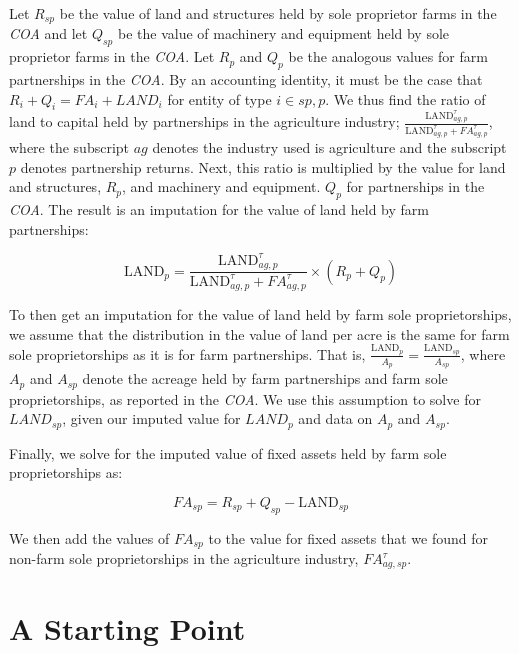 \documentclass[article,11pt,letterpaper,fleqn]{article}
\theoremstyle{definition}
\numberwithin{equation}{section}
\begin{document}
Let $R_{sp}$ be the value of land and structures held by sole proprietor farms in the \emph{COA} and let $Q_{sp}$ be the value of machinery and equipment held by sole proprietor farms in the \emph{COA}.  Let $R_{p}$ and $Q_{p}$ be the analogous values for farm partnerships in the \emph{COA}.  By an accounting identity, it must be the case that $R_{i}+Q_{i}={FA}_{i}+{LAND}_{i}$ for entity of type $i\in{sp,p}$.  We thus find the ratio of land to capital held by partnerships in the agriculture industry; $\frac{\text{LAND}^{\tau}_{ag,p}}{{\text{LAND}^{\tau}_{ag,p}}+{FA}^{\tau}_{ag,p}}$, where the subscript $ag$ denotes the industry used is agriculture and the subscript $p$ denotes partnership returns. Next, this ratio is multiplied by the value for land and structures, $R_{p}$, and machinery and equipment. $Q_{p}$ for partnerships in the \emph{COA}.  The result is an imputation for the value of land held by farm partnerships: 

\begin{equation}
\text{LAND}_{p}= \frac{\text{LAND}^{\tau}_{ag,p}}{\text{LAND}^{\tau}_{ag,p}+{FA}^{\tau}_{ag,p}}\times (R_{p}+Q_{p})
\end{equation}

To then get an imputation for the value of land held by farm sole proprietorships, we assume that the distribution in the value of land per acre is the same for farm sole proprietorships as it is for farm partnerships.  That is, $\frac{\text{LAND}_{p}}{A_{p}}=\frac{\text{LAND}_{sp}}{A_{sp}}$, where $A_{p}$ and $A_{sp}$ denote the acreage held by farm partnerships and farm sole proprietorships, as reported in the \emph{COA}.  We use this assumption to solve for ${LAND}_{sp}$, given our imputed value for ${LAND}_{p}$ and data on $A_{p}$ and ${A}_{sp}$.  

Finally, we solve for the imputed value of fixed assets held by farm sole proprietorships as: 

\begin{equation}
{FA}_{sp}=R_{sp}+Q_{sp}-\text{LAND}_{sp}
\end{equation}

We then add the values of ${FA}_{sp}$ to the value for fixed assets that we found for non-farm sole proprietorships in the agriculture industry, ${FA}^{\tau}_{ag,sp}$.



\section{A Starting Point}
\end{document}
